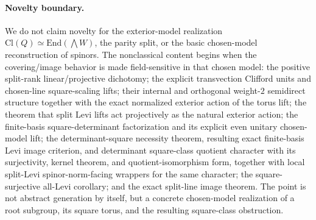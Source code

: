 \documentclass[11pt,a4paper]{article}
\theoremstyle{plain}
\theoremstyle{definition}
\theoremstyle{remark}
\newcommand{\Cl}{\mathrm{Cl}}
\newcommand{\End}{\mathrm{End}}
\begin{document}
\paragraph{Novelty boundary.} We do not claim novelty for the exterior-model
realization $\Cl(Q)\simeq\End(\bigwedge W)$, the parity split, or the basic
chosen-model reconstruction of spinors. The nonclassical content begins when the
covering/image behavior is made field-sensitive in that chosen model: the
positive split-rank linear/projective dichotomy; the explicit transvection
Clifford units and chosen-line square-scaling lifts; their internal and
orthogonal weight-$2$
semidirect structure together with the exact normalized exterior action of the
torus lift; the theorem that split Levi lifts act projectively as the natural
exterior action; the finite-basis square-determinant factorization and its
explicit even unitary chosen-model lift; the determinant-square necessity
theorem, resulting exact finite-basis Levi image criterion, and determinant
square-class quotient character with its surjectivity, kernel theorem, and quotient-isomorphism
form, together with local split-Levi spinor-norm-facing wrappers for the same
character; the
square-surjective all-Levi corollary; and the exact split-line image theorem.
The point is not abstract generation by itself,
but a concrete chosen-model realization of a root subgroup, its square torus,
and the resulting square-class obstruction.
\end{document}
